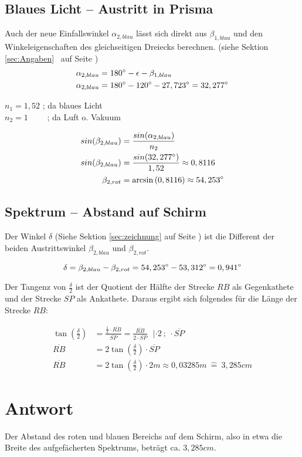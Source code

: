 \subsection{Blaues Licht -- Austritt in Prisma}

Auch der neue Einfallswinkel $\alpha_{2,blau}$ lässt sich direkt aus $\beta_{1,blau}$ und den Winkeleigenschaften des gleichseitigen Dreiecks berechnen. (siehe Sektion \ref{sec:Angaben} \ auf Seite \pageref{sec:Angaben})
\begin{align*}
	\alpha_{2,blau} &= 180 \degree - \epsilon - \beta_{1,blau} \\
	\alpha_{2,blau} &= 180 \degree - 120 \degree - 27,723 \degree = 32,277 \degree
\end{align*}

\noindent
$n_1 = 1,52$     ; da blaues Licht \\
$n_2 = 1$ \ \ \ \ ; da Luft o. Vakuum

\begin{align*}
	sin{(\beta_{2,blau})} &= \frac{sin{(\alpha_{2,blau}})}{n_2} \\
	sin{(\beta_{2,blau})} &= \frac{sin{(32,277 \degree})}{1,52} \approx 0,8116 \\
	\beta_{2,rot} &= \arcsin{(0,8116)} \approx 54,253 \degree
\end{align*}



\subsection{Spektrum -- Abstand auf Schirm}

Der Winkel $\delta$ (Siehe Sektion \ref{sec:zeichnung} auf Seite \pageref{sec:zeichnung}) ist die Different der beiden Austrittswinkel $\beta_{2,blau}$ und $\beta_{2,rot}$.

\begin{equation}
	\delta = \beta_{2,blau} - \beta_{2,rot} = 54,253 \degree - 53,312 \degree = 0,941 \degree
\end{equation}

Der Tangenz von $\frac{\delta}{2}$ ist der Quotient der Hälfte der Strecke $RB$ als Gegenkathete und der Strecke $SP$ als Ankathete. Daraus ergibt sich folgendes für die Länge der Strecke $RB$:

\begin{align*}
\tan{(\frac{\delta}{2})} &= \frac{\frac{1}{2} \cdot \overline{RB}}{\overline{SP}}
    = \frac{\overline{RB}}{2 \cdot \overline{SP}}
	\ \ \ | \cdot 2 \ ; \ \cdot \overline{SP} \\
\overline{RB} &= 2 \tan{(\frac{\delta}{2})} \cdot \overline{SP} \\
\overline{RB} &= 2 \tan{(\frac{\delta}{2})} \cdot 2m \approx 0,03285m \ \widehat{=} \ 3,285cm
\end{align*}


\section{Antwort}

Der Abstand des roten und blauen Bereichs auf dem Schirm, also in etwa die Breite des aufgefächerten Spektrums, beträgt ca. $3,285cm$.



